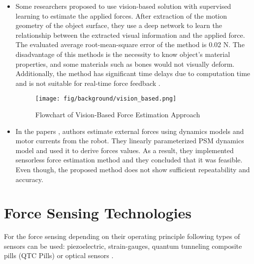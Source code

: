 \begin{itemize}
\item Some researchers proposed to use vision-based solution with supervised learning to estimate the applied forces. After extraction of the motion geometry of the object surface, they use a deep network to learn the relationship between the extracted visual information and the applied force. The evaluated average root-mean-square error of the method is 0.02 N.  The disadvantage of this methods is the necessity to know object’s material properties, and some materials such as bones would not visually deform. Additionally, the method has significant time delays due to computation time and is not suitable for real-time force feedback \cite{aviles_towards_2017}. 

\begin{figure}[h]
	\begin{center}
	\texttt{[image: fig/background/vision\_based.png]}
	\end{center}
	\vspace{-4mm}
	\caption[Flowchart of Vision-Based Force Estimation Approach]
	{Flowchart of Vision-Based Force Estimation Approach \cite{aviles_towards_2017}}
	\label{fig:visual_appr}
	\vspace{-2mm}
\end{figure}

\item In the papers \cite{sang_hongqiang_external_2017, yoon_design_2015}, authors estimate external forces using dynamics models and motor currents from the robot. They linearly parameterized PSM dynamics model and used it to derive forces values. As a result, they implemented sensorless force estimation method and they concluded that it was feasible. Even though, the proposed method does not show sufficient repeatability and accuracy.
\end{itemize}

\section{Force Sensing Technologies}
\label{sec:ForceSensors}

For the force sensing depending on their operating principle following types of sensors can be used: piezoelectric, strain-gauges, quantum tunneling composite pills (QTC Pills) or optical sensors \cite{SGandP1}.

